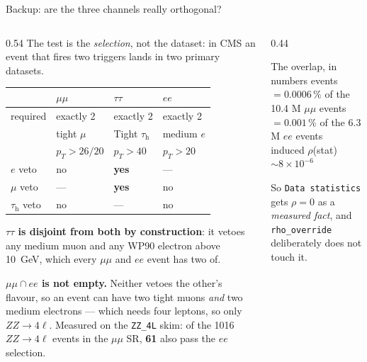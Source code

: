 \documentclass[aspectratio=169,9pt,t]{beamer}
\newcommand{\tauh}{\ensuremath{\tau_{\mathrm{h}}}}
\begin{document}
\begin{frame}[noframenumbering]{Backup: are the three channels really orthogonal?}
\begin{columns}[T]
\begin{column}{0.54\textwidth}\footnotesize
The test is the \emph{selection}, not the dataset: in CMS an event that fires two triggers lands in
two primary datasets.
\begin{center}\scriptsize
\begin{tabular}{@{}llll@{}}
\toprule
 & \textcolor{mumu}{$\mu\mu$} & \textcolor{tautau}{$\tau\tau$} & \textcolor{ee}{$ee$} \\ \midrule
required & exactly 2 & exactly 2 & exactly 2 \\
 & tight $\mu$ & Tight \tauh & medium $e$ \\
 & $p_T > 26/20$ & $p_T > 40$ & $p_T > 20$ \\
$e$ veto & no & \textbf{yes} & --- \\
$\mu$ veto & --- & \textbf{yes} & no \\
\tauh{} veto & no & --- & no \\
\bottomrule
\end{tabular}
\end{center}

\textbf{$\tau\tau$ is disjoint from both by construction}: it vetoes any medium muon and any WP90
electron above \SI{10}{GeV}, which every $\mu\mu$ and $ee$ event has two of.

\smallskip
\textbf{$\mu\mu \cap ee$ is not empty.} Neither vetoes the other's flavour, so an event can have
two tight muons \emph{and} two medium electrons --- which needs four leptons, so only
$ZZ\to4\ell$. Measured on the \texttt{ZZ\_4L} skim: of the 1016 $ZZ\to4\ell$ events in the
$\mu\mu$ SR, \textbf{61} also pass the $ee$ selection.
\end{column}

\begin{column}{0.44\textwidth}\footnotesize
\begin{block}{The overlap, in numbers}
 events\\[2pt]
{\footnotesize $= 0.0006\,\%$ of the 10.4 M $\mu\mu$ events\\
$= 0.001\,\%$ of the 6.3 M $ee$ events}\\[4pt]
{\footnotesize induced $\rho$(stat) $\sim 8\times10^{-6}$}
\end{block}
So \texttt{Data statistics} gets $\rho = 0$ as a \emph{measured fact}, and
\texttt{rho\_override} deliberately does not touch it.


\end{column}
\end{columns}
\end{frame}
\end{document}

